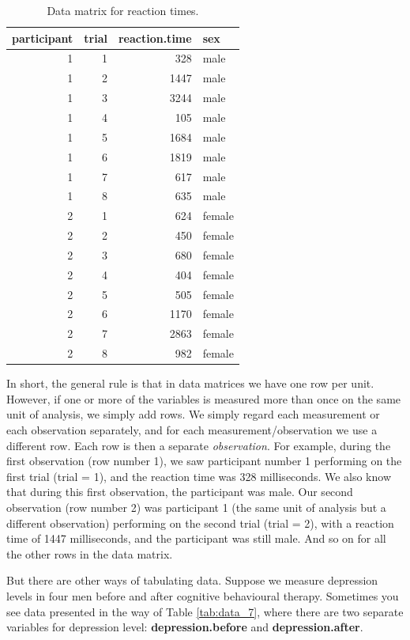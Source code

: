 \documentclass[]{report}\usepackage[]{graphicx}\usepackage[]{color}
\begin{document}
\begin{table}[ht]
\centering
\caption{Data matrix for reaction times.} 
\label{tab:data_6}
\begin{tabular}{rrrl}
  \hline
participant & trial & reaction.time & sex \\ 
  \hline
1 & 1 & 328 & male \\ 
  1 & 2 & 1447 & male \\ 
  1 & 3 & 3244 & male \\ 
  1 & 4 & 105 & male \\ 
  1 & 5 & 1684 & male \\ 
  1 & 6 & 1819 & male \\ 
  1 & 7 & 617 & male \\ 
  1 & 8 & 635 & male \\ 
  2 & 1 & 624 & female \\ 
  2 & 2 & 450 & female \\ 
  2 & 3 & 680 & female \\ 
  2 & 4 & 404 & female \\ 
  2 & 5 & 505 & female \\ 
  2 & 6 & 1170 & female \\ 
  2 & 7 & 2863 & female \\ 
  2 & 8 & 982 & female \\ 
   \hline
\end{tabular}
\end{table}



In short, the general rule is that in data matrices we have one row per unit. However, if one or more of the variables is measured more than once on the same unit of analysis, we simply add rows. We simply regard each measurement or each observation separately, and for each measurement/observation we use a different row. Each row is then a separate \textit{observation}. For example, during the first observation (row number 1), we saw participant number 1 performing on the first trial (trial = 1), and the reaction time was 328 milliseconds. We also know that during this first observation, the participant was male. Our second observation (row number 2) was participant 1 (the same unit of analysis but a different observation) performing on the second trial (trial = 2), with a reaction time of 1447 milliseconds, and the participant was still male. And so on for all the other rows in the data matrix.

But there are other ways of tabulating data. Suppose we measure depression levels in four men before and after cognitive behavioural therapy. Sometimes you see data presented in the way of Table \ref{tab:data_7}, where there are two separate variables for depression level: \textbf{depression.before} and \textbf{depression.after}.
\end{document}
